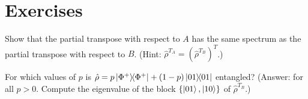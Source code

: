 \section{Exercises}
\begin{exercise}
Show that the partial transpose with respect to $A$ has the same spectrum as the partial transpose with respect to $B$. (Hint: $\hat\rho^{T_A}=(\hat\rho^{T_B})^T$.)
\end{exercise}
\begin{exercise}
For which values of $p$ is $\hat\rho=p\left|\Phi^+\middle\rangle\!\middle\langle\Phi^+\right|+(1-p)\left|01\middle\rangle\!\middle\langle01\right|$ entangled?
(Answer: for all $p>0$. Compute the eigenvalue of the block $\{\left|01\right\rangle,\left|10\right\rangle\}$ of $\hat\rho^{T_B}$.)
\end{exercise}
